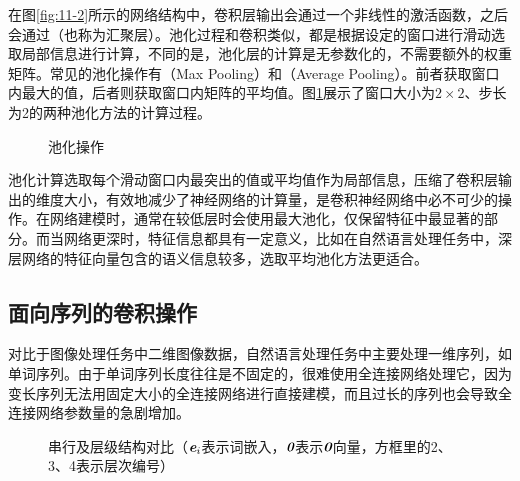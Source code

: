 \parinterval 在图\ref{fig:11-2}所示的网络结构中，卷积层输出会通过一个非线性的激活函数，之后会通过{\small{}}（也称为汇聚层）。池化过程和卷积类似，都是根据设定的窗口进行滑动选取局部信息进行计算，不同的是，池化层的计算是无参数化的，不需要额外的权重矩阵。常见的池化操作有{\small{}}（Max Pooling）和{\small{}}（Average Pooling）。前者获取窗口内最大的值，后者则获取窗口内矩阵的平均值。图\ref{fig:11-8}展示了窗口大小为$2 \times 2$、步长为2的两种池化方法的计算过程。

\begin{figure}[htp]
\centering
%
\caption{池化操作}
\label{fig:11-8}
\end{figure}

\parinterval 池化计算选取每个滑动窗口内最突出的值或平均值作为局部信息，压缩了卷积层输出的维度大小，有效地减少了神经网络的计算量，是卷积神经网络中必不可少的操作。在网络建模时，通常在较低层时会使用最大池化，仅保留特征中最显著的部分。而当网络更深时，特征信息都具有一定意义，比如在自然语言处理任务中，深层网络的特征向量包含的语义信息较多，选取平均池化方法更适合。



\subsection{面向序列的卷积操作}

\parinterval 对比于图像处理任务中二维图像数据，自然语言处理任务中主要处理一维序列，如单词序列。由于单词序列长度往往是不固定的，很难使用全连接网络处理它，因为变长序列无法用固定大小的全连接网络进行直接建模，而且过长的序列也会导致全连接网络参数量的急剧增加。

\begin{figure}[htp]
\centering
%
\caption{串行及层级结构对比（$\textbf{\em e}_i$表示词嵌入，$\textbf{\em 0}$表示$\textbf{\em 0}$向量，方框里的2、3、4表示层次编号）}
\label{fig:11-9}
\end{figure}

